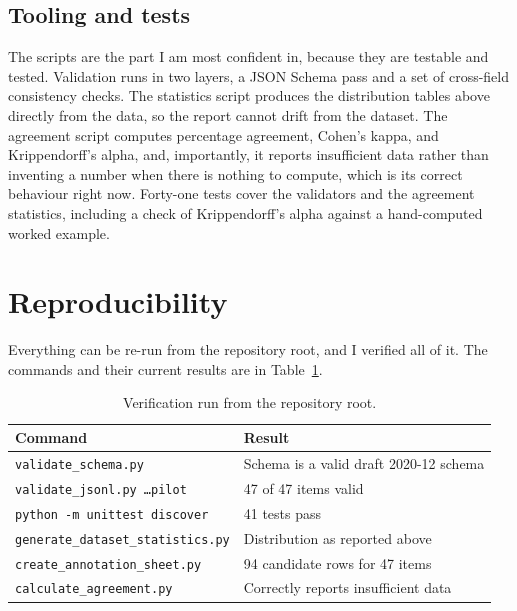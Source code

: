 \documentclass[11pt]{article}
\newcommand{\code}[1]{\texttt{\small #1}}
\begin{document}
\subsection{Tooling and tests}
The scripts are the part I am most confident in, because they are testable and
tested. Validation runs in two layers, a JSON Schema pass and a set of cross-field
consistency checks. The statistics script produces the distribution tables above
directly from the data, so the report cannot drift from the dataset. The agreement
script computes percentage agreement, Cohen's kappa, and Krippendorff's alpha, and,
importantly, it reports insufficient data rather than inventing a number when there
is nothing to compute, which is its correct behaviour right now. Forty-one tests
cover the validators and the agreement statistics, including a check of
Krippendorff's alpha against a hand-computed worked example.

\section{Reproducibility}

Everything can be re-run from the repository root, and I verified all of it. The
commands and their current results are in Table~\ref{tab:verify}.

\begin{table}[h]
\centering
\small
\begin{tabular}{@{}ll@{}}
\toprule
\textbf{Command} & \textbf{Result} \\
\midrule
\code{validate\_schema.py}                  & Schema is a valid draft 2020-12 schema \\
\code{validate\_jsonl.py \dots pilot}        & 47 of 47 items valid \\
\code{python -m unittest discover}          & 41 tests pass \\
\code{generate\_dataset\_statistics.py}      & Distribution as reported above \\
\code{create\_annotation\_sheet.py}          & 94 candidate rows for 47 items \\
\code{calculate\_agreement.py}               & Correctly reports insufficient data \\
\bottomrule
\end{tabular}
\caption{Verification run from the repository root.}
\label{tab:verify}
\end{table}
\end{document}
